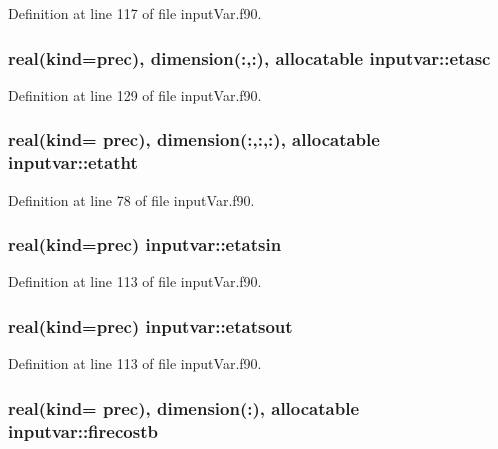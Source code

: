 Definition at line 117 of file input\-Var.\-f90.

\hypertarget{classinputvar_abf4e2424b8bd9e57417fa35d19c20a2d}{
\subsubsection[{etasc}]{\setlength{\rightskip}{0pt plus 5cm}real(kind=prec), dimension(\-:,\-:), allocatable inputvar\-::etasc}}\label{classinputvar_abf4e2424b8bd9e57417fa35d19c20a2d}


Definition at line 129 of file input\-Var.\-f90.

\hypertarget{classinputvar_a93c858e92300ce7dfc06627cbc72d681}{
\subsubsection[{etatht}]{\setlength{\rightskip}{0pt plus 5cm}real(kind= prec), dimension(\-:,\-:,\-:), allocatable inputvar\-::etatht}}\label{classinputvar_a93c858e92300ce7dfc06627cbc72d681}


Definition at line 78 of file input\-Var.\-f90.

\hypertarget{classinputvar_ad3f2c5423c51b51ac0cc6460154eab83}{
\subsubsection[{etatsin}]{\setlength{\rightskip}{0pt plus 5cm}real(kind=prec) inputvar\-::etatsin}}\label{classinputvar_ad3f2c5423c51b51ac0cc6460154eab83}


Definition at line 113 of file input\-Var.\-f90.

\hypertarget{classinputvar_a1855fdf34565c8a9555f350ae7958ecd}{
\subsubsection[{etatsout}]{\setlength{\rightskip}{0pt plus 5cm}real(kind=prec) inputvar\-::etatsout}}\label{classinputvar_a1855fdf34565c8a9555f350ae7958ecd}


Definition at line 113 of file input\-Var.\-f90.

\hypertarget{classinputvar_a1560f8312d0c0606566ee8f7e21c1e49}{
\subsubsection[{firecostb}]{\setlength{\rightskip}{0pt plus 5cm}real(kind= prec), dimension(\-:), allocatable inputvar\-::firecostb}}\label{classinputvar_a1560f8312d0c0606566ee8f7e21c1e49}


